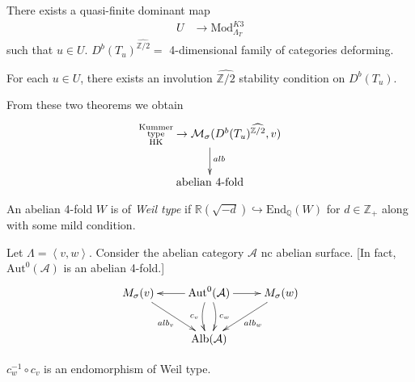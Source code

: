 \begin{theorem}
\label{theorem-exists-quasi-finit-dominant-map}
There exists a quasi-finite dominant map
\begin{align*}
U  &\longrightarrow \text{Mod}_{\Lambda_T}^{K3}
\end{align*}
such that $u \in U$. $D^b(T_u)^{\widehat{\mathbb{Z}/2}}=$ 4-dimensional family
of categories deforming.
\end{theorem}

\begin{theorem}
\label{theorem-}
For each $u \in U$, there exists an involution $\widehat{\mathbb{Z}/2}$
stability condition on $D^b(T_u)$.
\end{theorem}

From these two theorems we obtain
$$
\xymatrix{
\substack{\text{Kummer} \\\text{type}\\ \text{HK}}\to 
\mathcal{M}_{\sigma}(D^b(T_u)^{\widehat{\mathbb{Z}/2}},v)\ar[d]^{alb}\\
\text{abelian 4-fold}
}
$$

\begin{definition}
\label{definition-Weil-type}
An abelian 4-fold $W$ is of {\it Weil type} if 
$\mathbb{R}(\sqrt{-d}) \hookrightarrow \text{End}_{\mathbb{Q}}(W)$ for
$d\in\mathbb{Z}_+$ along with some mild condition.
\end{definition}

Let $\Lambda=\left<v,w\right>$. 
Consider the abelian category $\mathcal{A}$ nc abelian surface. [In fact, 
$\text{Aut}^0(\mathcal{A})$ is an abelian 4-fold.]
$$
\xymatrix{
M_\sigma(v)\ar[dr]_{alb_v}&  \text{Aut}^0(\mathcal{A})\ar[l]\ar[r]
\ar@/^{.5pc}/[d]^{c_w}\ar@/^{-0.5pc}/[d]_{c_v}
& M_\sigma(w)\ar[dl]^{alb_w}\\
&\text{Alb}(\mathcal{A})
}
$$
\begin{theorem}
\label{theorem-}
$c_w^{-1} \circ c_v$ is an endomorphism of Weil type.
\end{theorem}

